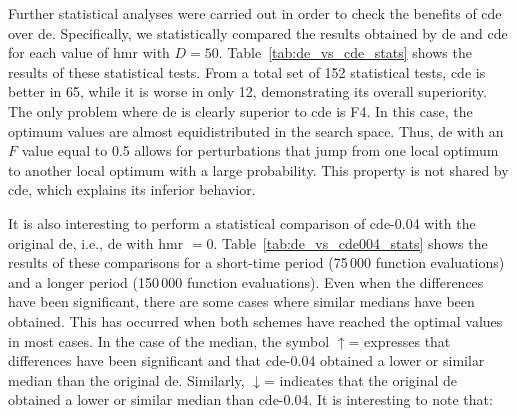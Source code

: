 \documentclass[review,3p]{elsarticle}
\newcommand{\CDE}{c{\sc de}}
\newcommand{\DE}{{\sc de}}
\newcommand{\HMR}{{\sc hmr}}
\begin{document}

Further statistical analyses were carried out in order to check the benefits of \CDE{} over \DE{}.
%
Specifically, we statistically compared the results obtained by \DE{} and \CDE{} for each value of \HMR{} with $D = 50$.
%
Table~\ref{tab:de_vs_cde_stats} shows the results of these statistical tests.
%
From a total set of 152 statistical tests, \CDE{} is better in 65, while it is worse in only 12, demonstrating its overall superiority.
%
The only problem where \DE{} is clearly superior to \CDE{} is F4.
%
In this case, the optimum values are almost equidistributed in the search space.
%
Thus, \DE{} with an $F$ value equal to 0.5 allows for perturbations that
jump from one local optimum to another local optimum with a large probability.
%
This property is not shared by \CDE{}, which explains its inferior behavior.



It is also interesting to perform a statistical comparison of \CDE{}-0.04 with the original \DE{}, i.e., \DE{} with \HMR{} $ = 0$.
%
Table~\ref{tab:de_vs_cde004_stats} shows the results of these comparisons
for a short-time period (75$\,$000 function evaluations) and a longer period (150$\,$000 function evaluations).
%
Even when the differences have been significant, there are some cases where similar medians have been obtained.
%
This has occurred when both schemes have reached the optimal values in most cases.
%
In the case of the median, the symbol $\uparrow$= expresses that differences have been significant and that \CDE{}-0.04 obtained
a lower or similar median than the original \DE{}.
%
Similarly, $\downarrow$= indicates that the original \DE{} obtained a lower or similar median than \CDE{}-0.04.
%
It is interesting to note that:
\end{document}
